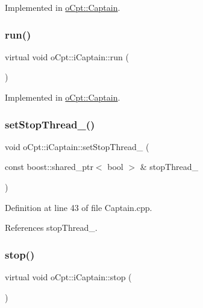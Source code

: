 Implemented in \hyperlink{classo_cpt_1_1_captain_a3afce8b5a16b91a8b848ab6ae12a5ca6}{o\+Cpt\+::\+Captain}.

\hypertarget{classo_cpt_1_1i_captain_a53d61f2d68b435f32ad66858ae898763}{}\label{classo_cpt_1_1i_captain_a53d61f2d68b435f32ad66858ae898763} 
\subsubsection{\texorpdfstring{run()}{run()}}
{\footnotesize\ttfamily virtual void o\+Cpt\+::i\+Captain\+::run (\begin{DoxyParamCaption}{ }\end{DoxyParamCaption})\hspace{0.3cm}{\ttfamily [pure virtual]}}



Implemented in \hyperlink{classo_cpt_1_1_captain_ade0ca7804340b555a9ead5dd01465045}{o\+Cpt\+::\+Captain}.

\hypertarget{classo_cpt_1_1i_captain_ad430c275b858faa6eee0be6cc0c8ea26}{}\label{classo_cpt_1_1i_captain_ad430c275b858faa6eee0be6cc0c8ea26} 
\subsubsection{\texorpdfstring{set\+Stop\+Thread\+\_\+()}{setStopThread\_()}}
{\footnotesize\ttfamily void o\+Cpt\+::i\+Captain\+::set\+Stop\+Thread\+\_\+ (\begin{DoxyParamCaption}\item[{const boost\+::shared\+\_\+ptr$<$ bool $>$ \&}]{stop\+Thread\+\_\+ }\end{DoxyParamCaption})}



Definition at line 43 of file Captain.\+cpp.



References stop\+Thread\+\_\+.

\hypertarget{classo_cpt_1_1i_captain_aeda385ea9a0ee33301dfda05098c836b}{}\label{classo_cpt_1_1i_captain_aeda385ea9a0ee33301dfda05098c836b} 
\subsubsection{\texorpdfstring{stop()}{stop()}}
{\footnotesize\ttfamily virtual void o\+Cpt\+::i\+Captain\+::stop (\begin{DoxyParamCaption}{ }\end{DoxyParamCaption})\hspace{0.3cm}{\ttfamily [pure virtual]}}



